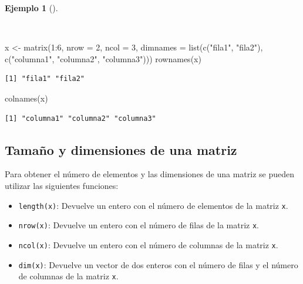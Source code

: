 \documentclass[
  a4paper,
]{scrreport}
\newenvironment{Shaded}{\begin{snugshade}}{\end{snugshade}}
\newcommand{\AttributeTok}[1]{\textcolor[rgb]{0.40,0.45,0.13}{#1}}
\newcommand{\DecValTok}[1]{\textcolor[rgb]{0.68,0.00,0.00}{#1}}
\newcommand{\FunctionTok}[1]{\textcolor[rgb]{0.28,0.35,0.67}{#1}}
\newcommand{\NormalTok}[1]{\textcolor[rgb]{0.00,0.23,0.31}{#1}}
\newcommand{\OtherTok}[1]{\textcolor[rgb]{0.00,0.23,0.31}{#1}}
\newcommand{\SpecialCharTok}[1]{\textcolor[rgb]{0.37,0.37,0.37}{#1}}
\newcommand{\StringTok}[1]{\textcolor[rgb]{0.13,0.47,0.30}{#1}}
\providecommand{\tightlist}{%
  \setlength{\itemsep}{0pt}\setlength{\parskip}{0pt}}\usepackage{longtable,booktabs,array}
\theoremstyle{definition}
\theoremstyle{definition}
\newtheorem{example}{Ejemplo}[chapter]
\theoremstyle{remark}
\begin{document}
\begin{example}[]\protect\hypertarget{exm-obtencion-nombres-matriz}{}\label{exm-obtencion-nombres-matriz}

~

\begin{Shaded}
\begin{Highlighting}[]
\NormalTok{x }\OtherTok{\textless{}{-}} \FunctionTok{matrix}\NormalTok{(}\DecValTok{1}\SpecialCharTok{:}\DecValTok{6}\NormalTok{, }\AttributeTok{nrow =} \DecValTok{2}\NormalTok{, }\AttributeTok{ncol =} \DecValTok{3}\NormalTok{, }\AttributeTok{dimnames =} \FunctionTok{list}\NormalTok{(}\FunctionTok{c}\NormalTok{(}\StringTok{"fila1"}\NormalTok{, }\StringTok{"fila2"}\NormalTok{), }\FunctionTok{c}\NormalTok{(}\StringTok{"columna1"}\NormalTok{, }\StringTok{"columna2"}\NormalTok{, }\StringTok{"columna3"}\NormalTok{)))}
\FunctionTok{rownames}\NormalTok{(x)}
\end{Highlighting}
\end{Shaded}

\begin{verbatim}
[1] "fila1" "fila2"
\end{verbatim}

\begin{Shaded}
\begin{Highlighting}[]
\FunctionTok{colnames}\NormalTok{(x)}
\end{Highlighting}
\end{Shaded}

\begin{verbatim}
[1] "columna1" "columna2" "columna3"
\end{verbatim}

\end{example}

\hypertarget{tamauxf1o-y-dimensiones-de-una-matriz}{%
\subsection{Tamaño y dimensiones de una
matriz}\label{tamauxf1o-y-dimensiones-de-una-matriz}}

Para obtener el número de elementos y las dimensiones de una matriz se
pueden utilizar las siguientes funciones:

\begin{itemize}
\tightlist
\item
  \texttt{length(x)}: Devuelve un entero con el número de elementos de
  la matriz \texttt{x}.
\item
  \texttt{nrow(x)}: Devuelve un entero con el número de filas de la
  matriz \texttt{x}.
\item
  \texttt{ncol(x)}: Devuelve un entero con el número de columnas de la
  matriz \texttt{x}.
\item
  \texttt{dim(x)}: Devuelve un vector de dos enteros con el número de
  filas y el número de columnas de la matriz \texttt{x}.
\end{itemize}
\end{document}
